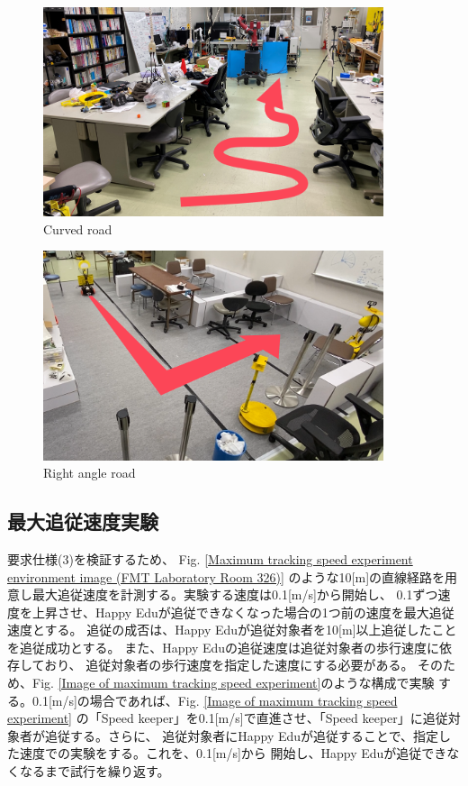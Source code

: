 \begin{figure}[h]
  \begin{center}
  \includegraphics[width=100mm,clip]{figure/Curve.PNG}
  \caption{Curved road}
  \label{Curved road}
  \end{center}
\end{figure}

\begin{figure}[h]
  \begin{center}
  \includegraphics[width=100mm,clip]{figure/Right-angle.PNG}
  \caption{Right angle road}
  \label{Right angle road}
  \end{center}
\end{figure}

\clearpage

\subsection{最大追従速度実験}
要求仕様(3)を検証するため、
Fig. \ref{Maximum tracking speed experiment environment image (FMT Laboratory Room 326)}
のような10[m]の直線経路を用意し最大追従速度を計測する。実験する速度は0.1[m/s]から開始し、
0.1ずつ速度を上昇させ、Happy Eduが追従できなくなった場合の1つ前の速度を最大追従速度とする。
追従の成否は、Happy Eduが追従対象者を10[m]以上追従したことを追従成功とする。
また、Happy Eduの追従速度は追従対象者の歩行速度に依存しており、
追従対象者の歩行速度を指定した速度にする必要がある。
そのため、Fig. \ref{Image of maximum tracking speed experiment}のような構成で実験
する。0.1[m/s]の場合であれば、Fig. \ref{Image of maximum tracking speed experiment}
の「Speed keeper」を0.1[m/s]で直進させ、「Speed keeper」に追従対象者が追従する。さらに、
追従対象者にHappy Eduが追従することで、指定した速度での実験をする。これを、0.1[m/s]から
開始し、Happy Eduが追従できなくなるまで試行を繰り返す。

